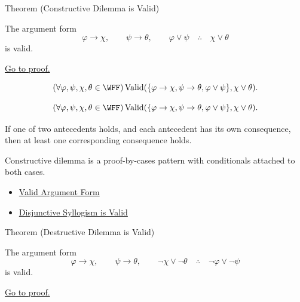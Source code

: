 \begin{theorembox}{Theorem (Constructive Dilemma is Valid)}
\begin{theorem}
\label{thm:constructive-dilemma-validity-propositional-logic}
The argument form
\[
\varphi\to\chi,\qquad \psi\to\theta,\qquad \varphi\lor\psi
\quad\therefore\quad
\chi\lor\theta
\]
is valid.

\noindent\hyperref[prf:constructive-dilemma-validity-propositional-logic]{Go to proof.}
\end{theorem}
\end{theorembox}

\begin{remark*}
\[
(\forall\varphi,\psi,\chi,\theta\in\WFF)
\operatorname{Valid}(\{\varphi\to\chi,\psi\to\theta,\varphi\lor\psi\},\chi\lor\theta).
\]
\end{remark*}

\begin{remark*}
\[
(\forall\varphi,\psi,\chi,\theta\in\WFF)
\operatorname{Valid}(\{\varphi\to\chi,\psi\to\theta,\varphi\lor\psi\},\chi\lor\theta).
\]

If one of two antecedents holds, and each antecedent has its own consequence,
then at least one corresponding consequence holds.
\end{remark*}

\begin{remark*}[Interpretation]
Constructive dilemma is a proof-by-cases pattern with conditionals attached to
both cases.
\end{remark*}

\begin{dependencies}
\begin{itemize}
  \item \hyperref[def:valid-argument-form-propositional-logic]{Valid Argument Form}
  \item \hyperref[thm:disjunctive-syllogism-validity-propositional-logic]{Disjunctive Syllogism is Valid}
\end{itemize}
\end{dependencies}

\begin{theorembox}{Theorem (Destructive Dilemma is Valid)}
\begin{theorem}
\label{thm:destructive-dilemma-validity-propositional-logic}
The argument form
\[
\varphi\to\chi,\qquad \psi\to\theta,\qquad \neg\chi\lor\neg\theta
\quad\therefore\quad
\neg\varphi\lor\neg\psi
\]
is valid.

\noindent\hyperref[prf:destructive-dilemma-validity-propositional-logic]{Go to proof.}
\end{theorem}
\end{theorembox}

